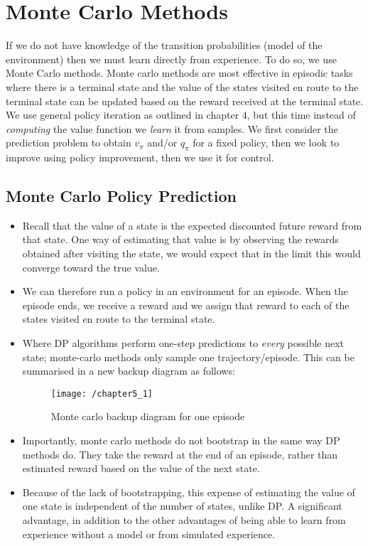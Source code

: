 \section{Monte Carlo Methods}
If we do not have knowledge of the transition probabilities (model of the environment) then we must learn directly from experience. To do so, we use Monte Carlo methods. Monte carlo methods are most effective in episodic tasks where there is a terminal state and the value of the states visited en route to the terminal state can be updated based on the reward received at the terminal state. We use general policy iteration as outlined in chapter 4, but this time instead of \textit{computing} the value function we \textit{learn} it from samples. We first consider the prediction problem to obtain $v_\pi$ and/or \textbf{$q_\pi$} for a fixed policy, then we look to improve using policy improvement, then we use it for control.  

\subsection{Monte Carlo Policy Prediction}
\begin{itemize}
\item Recall that the value of a state is the expected discounted future reward from that state. One way of estimating that value is by observing the rewards obtained after visiting the state, we would expect that in the limit this would converge toward the true value.
\item We can therefore run a policy in an environment for an episode. When the episode ends, we receive a reward and we assign that reward to each of the states visited en route to the terminal state. 
\item Where DP algorithms perform one-step predictions to \textit{every} possible next state; monte-carlo methods only sample one trajectory/episode. This can be summarised in a new backup diagram as follows:
\begin{figure}[h!]
	\centering
	\texttt{[image: /chapter5\_1]}
	\caption{Monte carlo backup diagram for one episode}
	\label{fig:monte carlo backup}
\end{figure}

\item Importantly, monte carlo methods do not bootstrap in the same way DP methods do. They take the reward at the end of an episode, rather than estimated reward based on the value of the next state.
\item Because of the lack of bootstrapping, this expense of estimating the value of one state is independent of the number of states, unlike DP. A significant advantage, in addition to the other advantages of being able to learn from experience without a model or from simulated experience. 
\end{itemize}

